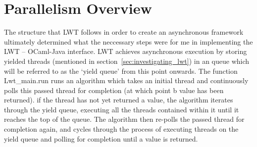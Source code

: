 \documentclass[12pt,twoside,notitlepage]{report}
\begin{document}
%
%

\section{Parallelism Overview}
\label{sec:parallelism_overview}
%
%
The structure that LWT follows in order to create an asynchronous framework ultimately determined what the neccessary steps were for me in implementing the LWT -- OCaml-Java interface. LWT achieves asynchronous execution by storing
yielded threads (mentioned in section~\ref{sec:investigating_lwt}) in an queue which will be referred to as the `yield queue' from this point onwards. The function Lwt\_main.run runs an algorithm which takes an initial thread and
continuously polls this passed thread for completion (at which point b value has been returned). if the thread has not yet returned a value, the algorithm iterates through the yield queue, executing all the threads contained within it
until it reaches the top of the queue. The algorithm then re-polls the passed thread for completion again, and cycles through the process of executing threads on the yield queue and polling for completion until a value is returned. 
\end{document}
